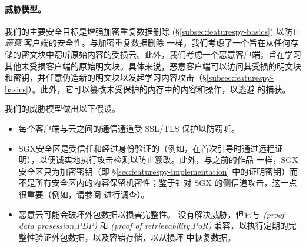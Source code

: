 \paragraph*{威胁模型。} 我们的主要安全目标是增强加密重复数据删除 (\S\ref{subsec:featurespy-basics}) 以防止 {\em 恶意} 客户端的安全性。与加密重复数据删除 \cite{bellare13a} 一样，我们考虑了一个旨在从任何存储的密文块中窃听原始内容的受损云。此外，我们考虑一个恶意客户端，旨在学习其他未受损客户端的原始明文块。具体来说，恶意客户端可以访问其受损的明文块和密钥，并任意伪造新的明文块以发起学习内容攻击（\S\ref{subsec:featurespy-basics}）。此外，它可以篡改未受保护的内存中的内容和操作，以逃避 \sysnameF 的捕获。

我们的威胁模型做出以下假设。
\begin{itemize}[leftmargin=*]
\item
  每个客户端与云之间的通信通道受 SSL/TLS 保护以防窃听。
\item
  SGX安全区是受信任和经过身份验证的（例如，在首次引导时通过远程证明），以便诚实地执行攻击检测以防止篡改。此外，与之前的作品 \cite{shinde20, ren21} 一样，SGX安全区只为加密密钥（即 \S\ref{sec:featurespy-implementation} 中的证明密钥）而不是所有安全区内的内容保留机密性；鉴于针对 SGX 的侧信道攻击，这一点很重要（例如，请参阅 \cite{fei21} 进行调查）。
\item
  恶意云可能会破坏外包数据以损害完整性。 \sysnameF 没有解决威胁，但它与 \textit{  (proof data prosession,PDP)} \cite{ateniese07} 和 \textit{  (proof of retrievability,PoR)} \cite{juels07} 兼容，以执行定期的完整性验证外包数据，以及容错存储，以从损坏 \cite{li15} 中恢复数据。
\end{itemize}